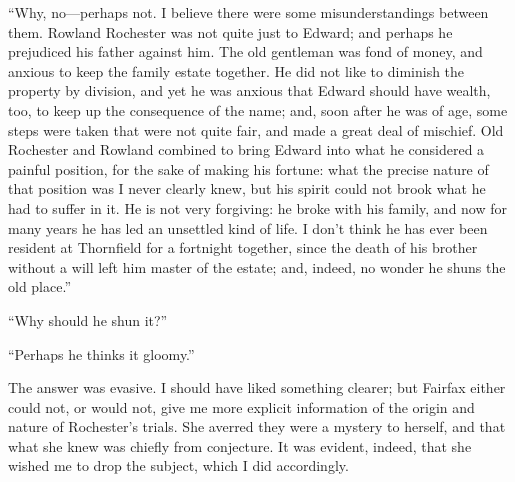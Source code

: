 \enquote{Why, no---perhaps not. I believe there were some
	misunderstandings between them. \Mr{} Rowland Rochester was not quite
	just to \Mr{} Edward; and perhaps he prejudiced his father against him.
	The old gentleman was fond of money, and anxious to keep the family
	estate together. He did not like to diminish the property by division,
	and yet he was anxious that \Mr{} Edward should have wealth, too, to keep
	up the consequence of the name; and, soon after he was of age, some
	steps were taken that were not quite fair, and made a great deal of
	mischief. Old \Mr{} Rochester and \Mr{} Rowland combined to bring \Mr{}
	Edward into what he considered a painful position, for the sake of
	making his fortune: what the precise nature of that position was I never
	clearly knew, but his spirit could not brook what he had to suffer in
	it. He is not very forgiving: he broke with his family, and now for
	many years he has led an unsettled kind of life. I don't think he has
	ever been resident at Thornfield for a fortnight together, since the
	death of his brother without a will left him master of the estate; and,
	indeed, no wonder he shuns the old place.}

\enquote{Why should he shun it?}

\enquote{Perhaps he thinks it gloomy.}

The answer was evasive. I should have liked something clearer; but \Mrs{}
Fairfax either could not, or would not, give me more explicit
information of the origin and nature of \Mr{} Rochester's trials. She
averred they were a mystery to herself, and that what she knew was
chiefly from conjecture. It was evident, indeed, that she wished me to
drop the subject, which I did accordingly.
